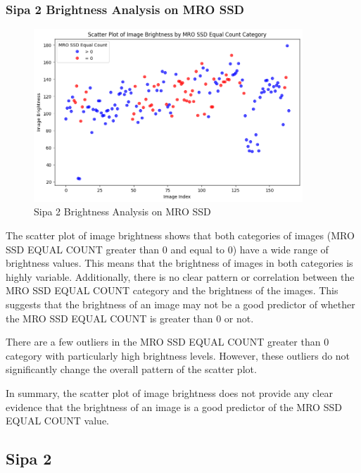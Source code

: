 \subsubsection{Sipa 2 Brightness Analysis on MRO SSD}


\begin{figure}[ht]
    \centering
    \includegraphics[width=0.9\textwidth]{Figures/Results/sipa_02/brightness.png}
    \caption[Sipa 2 Brightness Analysis on MRO SSD]{Sipa 2 Brightness Analysis on MRO SSD}
    \label{fig:Sipa 2 Brightness Analysis on MRO SSD}
\end{figure}



The scatter plot of image brightness shows that both categories of images (MRO SSD EQUAL COUNT greater than 0 and equal to 0) have a wide range of brightness values. This means that the brightness of images in both categories is highly variable. Additionally, there is no clear pattern or correlation between the MRO SSD EQUAL COUNT category and the brightness of the images. This suggests that the brightness of an image may not be a good predictor of whether the MRO SSD EQUAL COUNT is greater than 0 or not.

There are a few outliers in the MRO SSD EQUAL COUNT greater than 0 category with particularly high brightness levels. However, these outliers do not significantly change the overall pattern of the scatter plot.

In summary, the scatter plot of image brightness does not provide any clear evidence that the brightness of an image is a good predictor of the MRO SSD EQUAL COUNT value.

\newpage


\subsection{Sipa 2}

